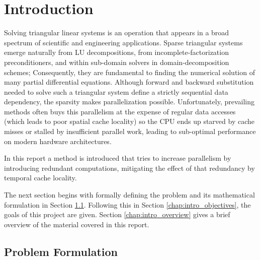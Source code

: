 \chapter{Introduction}
\label{chapter:introduction}

Solving triangular linear systems is an operation that appears in a broad spectrum of scientific and engineering applications. Sparse triangular systems emerge naturally from LU decompositions, from incomplete-factorization preconditioners, and within sub-domain solvers in domain-decomposition schemes; Consequently, they are fundamental to finding the numerical solution of many partial differential equations. Although forward and backward substitution needed to solve such a triangular system define a strictly sequential data dependency, the sparsity makes parallelization possible. Unfortunately, prevailing methods often buys this parallelism at the expense of regular data accesses (which leads to poor spatial cache locality) so the CPU ends up starved by cache misses or stalled by insufficient parallel work, leading to sub-optimal performance on modern hardware architectures.

In this report a method is introduced that tries to increase parallelism by introducing redundant computations, mitigating the effect of that redundancy by temporal cache locality.

The next section begins with formally defining the problem and its mathematical formulation in Section \ref{chap:lr_problem_formulation}. Following this in Section \ref{chap:intro_objectives}, the goals of this project are given. Section \ref{chap:intro_overview} gives a brief overview of the material covered in this report.


\section{Problem Formulation}
\label{chap:lr_problem_formulation}

